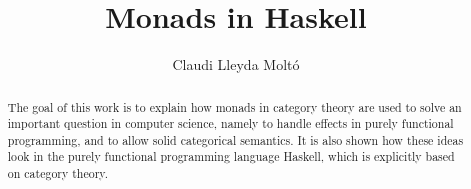 \documentclass[a4paper]{article}
\title{Monads in Haskell}
\author{Claudi Lleyda Moltó}
\date{}
\theoremstyle{plain}
\theoremstyle{definition}
\begin{document}
\maketitle
\begin{abstract}
    The goal of this work is to explain how monads in category theory are used
    to solve an important question in computer science, namely to handle effects
    in purely functional programming, and to allow solid categorical semantics.
    It is also shown how these ideas look in the purely functional programming
    language Haskell, which is explicitly based on category theory.
\end{abstract}
\tableofcontents
\clearpage








\printbibliography
\end{document}
